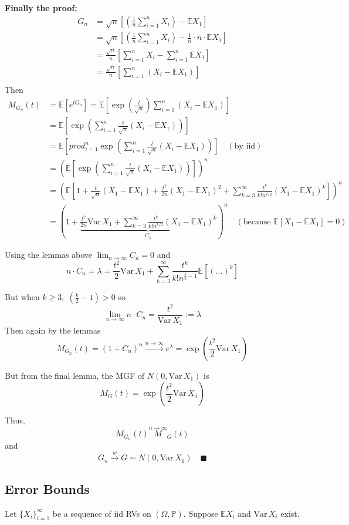 \documentclass[12pt]{article}
\renewcommand{\P}{\mathbb{P}}
\newcommand{\E}{\mathbb{E}}
\newcommand{\Var}{\text{Var}\,}
\begin{document}
\textbf{Finally the proof:}
\begin{align*}
    G_n &= \sqrt{n} \left[\left(\frac{1}{n}\sum_{i=1}^n X_i\right) - \E X_1\right]\\
    &= \sqrt{n} \left[\left(\frac{1}{n}\sum_{i=1}^n X_i\right) - \frac{1}{n} \cdot n \cdot \E X_1\right]\\
    &= \frac{\sqrt{n}}{n} \left[\sum_{i=1}^n X_i - \sum_{i=1}^n \E X_1\right]\\
    &= \frac{\sqrt{n}}{n} \left[\sum_{i=1}^n (X_i - \E X_1)\right]\\
\end{align*}
Then 
\begin{align*}
    M_{G_n}(t) &= \E[e^{tG_n}] = \E[ \exp(\frac{t}{\sqrt{n}})\sum_{i=1}^n (X_i - \E X_1)]\\
    &= \E\left[\exp\left(\sum_{i=1}^n \frac{t}{\sqrt{n}}(X_i - \E X_1)\right)\right]\\
    &= \E\left[prod_{i=1}^n\exp\left(\sum_{i=1}^n \frac{t}{\sqrt{n}}(X_i - \E X_1)\right)\right]\quad (\text{by iid})\\
    &= \left(\E\left[\exp\left(\sum_{i=1}^n \frac{t}{\sqrt{n}}(X_i - \E X_1)\right)\right]\right)^n\\
    &= \left(\E\left[1 + \frac{t}{\sqrt{n}}(X_1 - \E X_1) + \frac{t^2}{2n}(X_1 - \E X_1)^2 + \sum_{k=3}^\infty \frac{t^k}{k!n^{k/2}}(X_1 - \E X_1)^k\right]\right)^n\\
    &= \left(1 + \underbrace{\frac{t^2}{2n}\Var X_1 +  \sum_{k=3}^\infty \frac{t^k}{k!n^{k/2}}(X_1 - \E X_1)^k}_{C_n}\right)^n\quad (\text{because } \E[X_1 - \E X_1] = 0)
\end{align*}

Using the lemmas above $\lim_{n\to\infty} C_n = 0$ and 
\[n\cdot C_n = \lambda = \frac{t^2}{2}\Var X_1 + \sum_{k=3}^\infty \frac{t^k}{k!n^{\frac{k}{2} - 1}}\E[(...)^k]\]

But when $k \geq 3, \; (\frac{k}{2} - 1) >0$ so 
\[\lim_{n\to \infty} n \cdot C_n = \frac{t^2}{\Var X_1} := \lambda\]
Then again by the lemmas
\[M_{G_n}(t) = (1 + C_n)^n \overset{n\to \infty}{\longrightarrow} e^{\lambda} = \exp(\frac{t^2}{2}\Var X_1)\]

But from the final lemma, the MGF of $N(0, \Var X_1)$ is 
\[M_G(t) = \exp(\frac{t^2}{2}\Var X_1)\] 

Thus, 
\[M_{G_n}(t) \overset{n\to \infty} M_G(t)\]
and 
\[G_n \overset{w}{\to} G \sim N(0, \Var X_1) \quad \blacksquare\]

\subsection{Error Bounds}
Let $\{X_i\}_{i=1}^\infty$ be a sequence of iid RVs on $(\Omega, \P)$. Suppose $\E X_i$ and $\Var X_i$ exist. 
\end{document}
